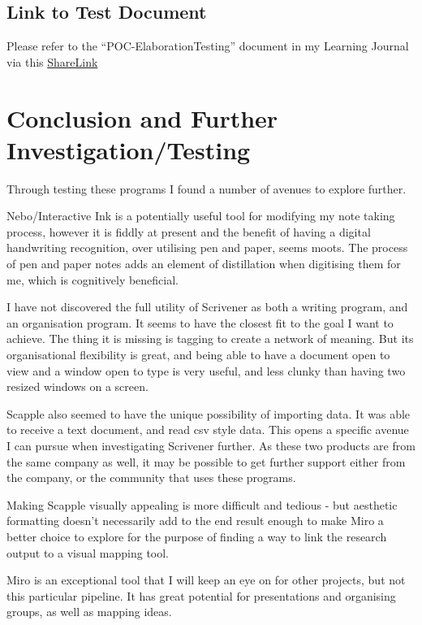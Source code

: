 \documentclass{article}
\begin{document}
\subsection{Link to Test Document}

Please refer to the ``POC-ElaborationTesting'' document in my Learning Journal via this \href{https://www.overleaf.com/read/vgmsjfphycpq}{ShareLink}

\section{Conclusion and Further Investigation/Testing}

Through testing these programs I found a number of avenues to explore further. 

Nebo/Interactive Ink is a potentially useful tool for modifying my note taking process, however it is fiddly at present and the benefit of having a digital handwriting recognition, over utilising pen and paper, seems moots. The process of pen and paper notes adds an element of distillation when digitising them for me, which is cognitively beneficial. 

I have not discovered the full utility of Scrivener as both a writing program, and an organisation program. It seems to have the closest fit to the goal I want to achieve. The thing it is missing is tagging to create a network of meaning.
But its organisational flexibility is great, and being able to have a document open to view and a window open to type is very useful, and less clunky than having two resized windows on a screen. 

Scapple also seemed to have the unique possibility of importing data. It was able to receive a text document, and read csv style data. This opens a specific avenue I can pursue when investigating Scrivener further. As these two products are from the same company as well, it may be possible to get further support either from the company, or the community that uses these programs. 

Making Scapple visually appealing is more difficult and tedious - but aesthetic formatting doesn't necessarily add to the end result enough to make Miro a better choice to explore for the purpose of finding a way to link the research output to a visual mapping tool.

Miro is an exceptional tool that I will keep an eye on for other projects, but not this particular pipeline. It has great potential for presentations and organising groups, as well as mapping ideas. 
\end{document}
